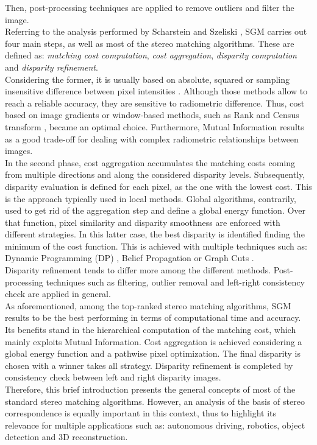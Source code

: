 Then, post-processing techniques are applied to remove outliers and filter the image.\\
Referring to the analysis performed by Scharstein and Szeliski \cite{Scharstein2001}, SGM carries out four main steps, as well as most of the stereo matching algorithms. 
These are defined as: \textit{matching cost computation}, \textit{cost aggregation}, \textit{disparity computation} and \textit{disparity refinement}. \\
Considering the former, it is usually based on absolute, squared or sampling insensitive difference between pixel intensities \cite{Hirschmuller2008}. 
Although those methods allow to reach a reliable accuracy, they are sensitive to radiometric difference. 
Thus, cost based on image gradients or window-based methods, such as Rank and Census transform \cite{Ko2017}, became an optimal choice. 
Furthermore, Mutual Information results as a good trade-off for dealing with complex radiometric relationships between images.\\
In the second phase, cost aggregation accumulates the matching costs coming from multiple directions and along the considered disparity levels. 
Subsequently, disparity evaluation is defined for each pixel, as the one with the lowest cost.
This is the approach typically used in local methods. 
Global algorithms, contrarily, used to get rid of the aggregation step and define a global energy function. 
Over that function, pixel similarity and disparity smoothness are enforced with different strategies. 
In this latter case, the best disparity is identified finding the minimum of the cost function. 
This is achieved with multiple techniques such as: Dynamic Programming (DP) \cite{Birchfield1999}, Belief Propagation \cite{Klaus2006} or Graph Cuts \cite{Kolmogorov2001}.\\
Disparity refinement tends to differ more among the different methods. 
Post-processing techniques such as filtering, outlier removal and left-right consistency check are applied in general.\\
As aforementioned, among the top-ranked stereo matching algorithms, SGM results to be the best performing in terms of computational time and accuracy. 
Its benefits stand in the hierarchical computation of the matching cost, which mainly exploits Mutual Information. 
Cost aggregation is achieved considering a global energy function and a pathwise pixel optimization. 
The final disparity is chosen with a winner takes all strategy. 
Disparity refinement is completed by consistency check between left and right disparity images. \\
Therefore, this brief introduction presents the general concepts of most of the standard stereo matching algorithms.
However, an analysis of the basis of stereo correspondence is equally important in this context, thus to highlight its relevance for multiple applications such as: autonomous driving, robotics, object detection and 3D reconstruction.


